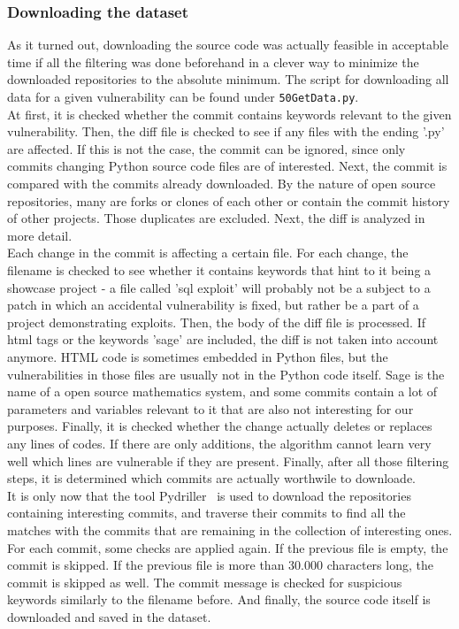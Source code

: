 \documentclass[
	a4paper,
	pagesize,
	pdftex,
	12pt,
	twoside, %
	BCOR=5mm, %
	ngerman,
	fleqn,
	final,
	]{scrartcl}
\begin{document}
\subsubsection{Downloading the dataset}

As it turned out, downloading the source code was actually feasible in acceptable time if all the filtering was done beforehand in a clever way to minimize the downloaded repositories to the absolute minimum. The script for downloading all data for a given vulnerability can be found under \texttt{50GetData.py}.\\
At first, it is checked whether the commit contains keywords relevant to the given vulnerability. Then, the diff file is checked to see if any files with the ending '.py' are affected. If this is not the case, the commit can be ignored, since only commits changing Python source code files are of interested. Next, the commit is compared with the commits already downloaded. By the nature of open source repositories, many are forks or clones of each other or contain the commit history of other projects. Those duplicates are excluded. Next, the diff is analyzed in more detail.\\
Each change in the commit is affecting a certain file. For each change, the filename is checked to see whether it contains keywords that hint to it being a showcase project - a file called 'sql exploit' will probably not be a subject to a patch in which an accidental vulnerability is fixed, but rather be a part of a project demonstrating exploits. Then, the body of the diff file is processed. If html tags or the keywords 'sage' are included, the diff is not taken into account anymore. HTML code is sometimes embedded in Python files, but the vulnerabilities in those files are usually not in the Python code itself. Sage is the name of a open source mathematics system, and some commits contain a lot of parameters and variables relevant to it that are also not interesting for our purposes. Finally, it is checked whether the change actually deletes or replaces any lines of codes. If there are only additions, the algorithm cannot learn very well which lines are vulnerable if they are present. Finally, after all those filtering steps, it is determined which commits are actually worthwile to downloade.\\
It is only now that the tool Pydriller~\cite{Spadini.2018} is used to download the repositories containing interesting commits, and traverse their commits to find all the matches with the commits that are remaining in the collection of interesting ones. For each commit, some checks are applied again. If the previous file is empty, the commit is skipped. If the previous file is more than 30.000 characters long, the commit is skipped as well. The commit message is checked for suspicious keywords similarly to the filename before. And finally, the source code itself is downloaded and saved in the dataset. 
\end{document}
